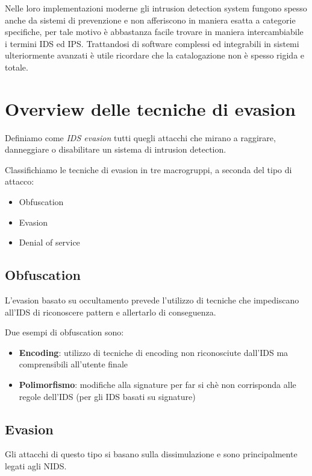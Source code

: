 \documentclass{ldr-article}
\begin{document}
Nelle loro implementazioni moderne gli intrusion detection system fungono spesso anche da sistemi di prevenzione e non afferiscono in maniera esatta a categorie specifiche, per tale motivo è abbastanza facile trovare in maniera intercambiabile i termini IDS ed IPS. Trattandosi di software complessi ed integrabili in sistemi ulteriormente avanzati è utile ricordare che la catalogazione non è spesso rigida e totale.

\section{Overview delle tecniche di evasion}

Definiamo come \textit{IDS evasion} tutti quegli attacchi che mirano a raggirare, danneggiare o disabilitare un sistema di intrusion detection.

Classifichiamo le tecniche di evasion in tre macrogruppi, a seconda del tipo di attacco:

\begin{itemize}
  \item Obfuscation
  \item Evasion
  \item Denial of service
\end{itemize}

\subsection{Obfuscation}
L'evasion basato su occultamento prevede l'utilizzo di tecniche che impediscano all'IDS di riconoscere pattern e allertarlo di conseguenza.

Due esempi di obfuscation sono:

\begin{itemize}
  \item \textbf{Encoding}: utilizzo di tecniche di encoding non riconosciute dall'IDS ma comprensibili all'utente finale
  \item \textbf{Polimorfismo}: modifiche alla signature per far si chè non corrisponda alle regole dell'IDS (per gli IDS basati su signature)
\end{itemize}

\subsection{Evasion}
Gli attacchi di questo tipo si basano sulla dissimulazione e sono principalmente legati agli NIDS.
\end{document}
